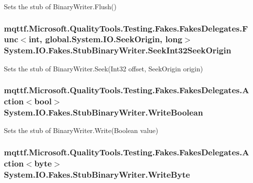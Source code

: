 Sets the stub of Binary\-Writer.\-Flush()

\hypertarget{class_system_1_1_i_o_1_1_fakes_1_1_stub_binary_writer_a4d79180fd237a80eea5620f2fd39cab8}{
\subsubsection[{Seek\-Int32\-Seek\-Origin}]{\setlength{\rightskip}{0pt plus 5cm}mqttf.\-Microsoft.\-Quality\-Tools.\-Testing.\-Fakes.\-Fakes\-Delegates.\-Func$<$int, global.\-System.\-I\-O.\-Seek\-Origin, long$>$ System.\-I\-O.\-Fakes.\-Stub\-Binary\-Writer.\-Seek\-Int32\-Seek\-Origin}}\label{class_system_1_1_i_o_1_1_fakes_1_1_stub_binary_writer_a4d79180fd237a80eea5620f2fd39cab8}


Sets the stub of Binary\-Writer.\-Seek(\-Int32 offset, Seek\-Origin origin)

\hypertarget{class_system_1_1_i_o_1_1_fakes_1_1_stub_binary_writer_ad384a3220b31d72508e793be024f76c2}{
\subsubsection[{Write\-Boolean}]{\setlength{\rightskip}{0pt plus 5cm}mqttf.\-Microsoft.\-Quality\-Tools.\-Testing.\-Fakes.\-Fakes\-Delegates.\-Action$<$bool$>$ System.\-I\-O.\-Fakes.\-Stub\-Binary\-Writer.\-Write\-Boolean}}\label{class_system_1_1_i_o_1_1_fakes_1_1_stub_binary_writer_ad384a3220b31d72508e793be024f76c2}


Sets the stub of Binary\-Writer.\-Write(\-Boolean value)

\hypertarget{class_system_1_1_i_o_1_1_fakes_1_1_stub_binary_writer_a3cd780429cede4287135d4020b7e221f}{
\subsubsection[{Write\-Byte}]{\setlength{\rightskip}{0pt plus 5cm}mqttf.\-Microsoft.\-Quality\-Tools.\-Testing.\-Fakes.\-Fakes\-Delegates.\-Action$<$byte$>$ System.\-I\-O.\-Fakes.\-Stub\-Binary\-Writer.\-Write\-Byte}}\label{class_system_1_1_i_o_1_1_fakes_1_1_stub_binary_writer_a3cd780429cede4287135d4020b7e221f}


